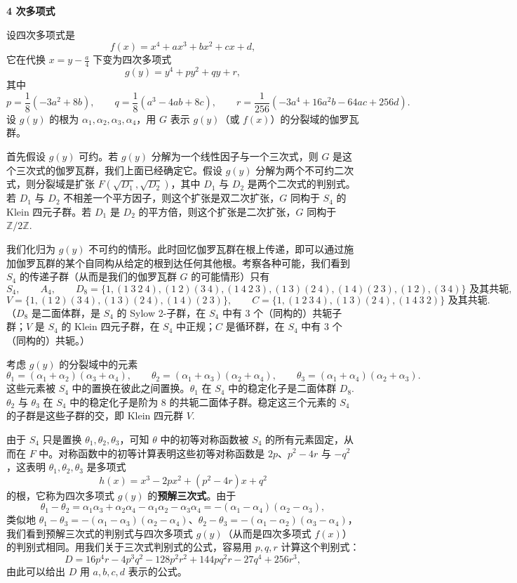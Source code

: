\noindent\textbf{4 次多项式}

设四次多项式是
\[
f(x) = x^4+ax^3+bx^2+cx+d,
\]
它在代换 \(x = y-\frac{a}{4}\) 下变为四次多项式
\[
g(y) = y^4+py^2+qy+r,
\]
其中
\[
p = \frac{1}{8}(-3a^2+8b), \qquad q = \frac{1}{8}(a^3-4ab+8c), \qquad r = \frac{1}{256}(-3a^4+16a^2b-64ac+256d).
\]
设 \(g(y)\) 的根为 \(\alpha_1, \alpha_2, \alpha_3, \alpha_4\)，用 \(G\) 表示 \(g(y)\)（或 \(f(x)\)）的分裂域的伽罗瓦群。

首先假设 \(g(y)\) 可约。若 \(g(y)\) 分解为一个线性因子与一个三次式，则 \(G\) 是这个三次式的伽罗瓦群，我们上面已经确定它。假设 \(g(y)\) 分解为两个不可约二次式，则分裂域是扩张 \(F(\sqrt{D_1}, \sqrt{D_2})\)，其中 \(D_1\) 与 \(D_2\) 是两个二次式的判别式。若 \(D_1\) 与 \(D_2\) 不相差一个平方因子，则这个扩张是双二次扩张，\(G\) 同构于 \(S_4\) 的 Klein 四元子群。若 \(D_1\) 是 \(D_2\) 的平方倍，则这个扩张是二次扩张，\(G\) 同构于 \(\mathbb{Z}/2\mathbb{Z}\).

我们化归为 \(g(y)\) 不可约的情形。此时回忆伽罗瓦群在根上传递，即可以通过施加伽罗瓦群的某个自同构从给定的根到达任何其他根。考察各种可能，我们看到 \(S_4\) 的传递子群（从而是我们的伽罗瓦群 \(G\) 的可能情形）只有
\[
S_4, \qquad A_4, \qquad D_8 = \{1, (1\ 3\ 2\ 4), (1\ 2)(3\ 4), (1\ 4\ 2\ 3), (1\ 3)(2\ 4), (1\ 4)(2\ 3), (1\ 2), (3\ 4)\} \text{ 及其共轭},
\]
\[
V = \{1, (1\ 2)(3\ 4), (1\ 3)(2\ 4), (1\ 4)(2\ 3)\}, \qquad C = \{1, (1\ 2\ 3\ 4), (1\ 3)(2\ 4), (1\ 4\ 3\ 2)\} \text{ 及其共轭}.
\]
（\(D_8\) 是二面体群，是 \(S_4\) 的 Sylow 2-子群，在 \(S_4\) 中有 3 个（同构的）共轭子群；\(V\) 是 \(S_4\) 的 Klein 四元子群，在 \(S_4\) 中正规；\(C\) 是循环群，在 \(S_4\) 中有 3 个（同构的）共轭。）

考虑 \(g(y)\) 的分裂域中的元素
\[
\theta_1 = (\alpha_1+\alpha_2)(\alpha_3+\alpha_4), \qquad \theta_2 = (\alpha_1+\alpha_3)(\alpha_2+\alpha_4), \qquad \theta_3 = (\alpha_1+\alpha_4)(\alpha_2+\alpha_3).
\]
这些元素被 \(S_4\) 中的置换在彼此之间置换。\(\theta_1\) 在 \(S_4\) 中的稳定化子是二面体群 \(D_8\). \(\theta_2\) 与 \(\theta_3\) 在 \(S_4\) 中的稳定化子是阶为 8 的共轭二面体子群。稳定这三个元素的 \(S_4\) 的子群是这些子群的交，即 Klein 四元群 \(V\).

由于 \(S_4\) 只是置换 \(\theta_1, \theta_2, \theta_3\)，可知 \(\theta\) 中的初等对称函数被 \(S_4\) 的所有元素固定，从而在 \(F\) 中。对称函数中的初等计算表明这些初等对称函数是 \(2p\)、\(p^2-4r\) 与 \(-q^2\)，这表明 \(\theta_1, \theta_2, \theta_3\) 是多项式
\[
h(x) = x^3-2px^2+(p^2-4r)x+q^2
\]
的根，它称为四次多项式 \(g(y)\) 的\textbf{预解三次式}。由于
\[
\theta_1-\theta_2 = \alpha_1\alpha_3+\alpha_2\alpha_4-\alpha_1\alpha_2-\alpha_3\alpha_4 = -(\alpha_1-\alpha_4)(\alpha_2-\alpha_3),
\]
类似地 \(\theta_1-\theta_3 = -(\alpha_1-\alpha_3)(\alpha_2-\alpha_4)\)、\(\theta_2-\theta_3 = -(\alpha_1-\alpha_2)(\alpha_3-\alpha_4)\)，我们看到预解三次式的判别式与四次多项式 \(g(y)\)（从而是四次多项式 \(f(x)\)）的判别式相同。用我们关于三次式判别式的公式，容易用 \(p, q, r\) 计算这个判别式：
\[
D = 16p^4r-4p^3q^2-128p^2r^2+144pq^2r-27q^4+256r^3,
\]
由此可以给出 \(D\) 用 \(a, b, c, d\) 表示的公式。

